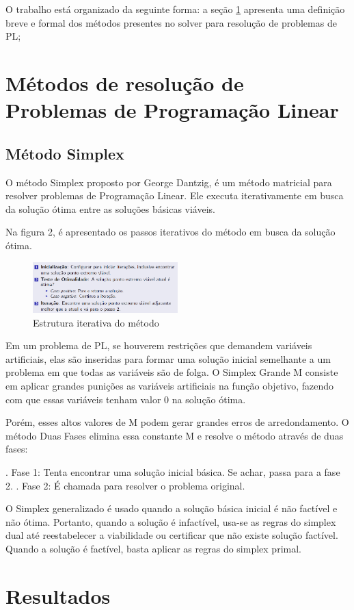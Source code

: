 \documentclass [11pt]{articleSBPO}
\begin{document}
O trabalho está organizado da seguinte forma: a seção \ref{sec:metodos} apresenta uma definição breve e formal dos métodos presentes no solver para resolução de problemas de PL;


\section{Métodos de resolução de Problemas de Programação Linear}
\label{sec:metodos}

\subsection{Método Simplex}

O método Simplex proposto por George Dantzig, é um método matricial para resolver problemas de Programação Linear. Ele executa iterativamente em busca da solução ótima entre as soluções básicas viáveis. 

Na figura 2, é apresentado os passos iterativos do método em busca da solução ótima.

\begin{figure}[!h]
\centering
\includegraphics[width=0.5\textwidth]{img/img1.png}
\caption[]{Estrutura iterativa do método}
\label{fig:figura2}
\end{figure}

Em um problema de PL, se houverem restrições que demandem variáveis artificiais, elas são inseridas para formar uma solução inicial semelhante a um problema em que todas as variáveis são de folga. O Simplex Grande M consiste em aplicar grandes punições as variáveis artificiais na função objetivo, fazendo com que essas variáveis tenham valor 0 na solução ótima.

Porém, esses altos valores de M podem gerar grandes erros de arredondamento. O método Duas Fases elimina essa constante M e resolve o método através de duas fases:

. Fase 1: Tenta encontrar uma solução inicial básica. Se achar, passa para a fase 2.
. Fase 2: É chamada para resolver o problema original.

O Simplex generalizado é usado quando a solução básica inicial é não factível e não ótima. Portanto, quando a solução é infactível, usa-se as regras do simplex dual até reestabelecer a viabilidade ou certificar que não existe solução factível. Quando a solução é factível, basta aplicar as regras do simplex primal.

\section{Resultados}
\label{sec:resultados}



\end{document}
